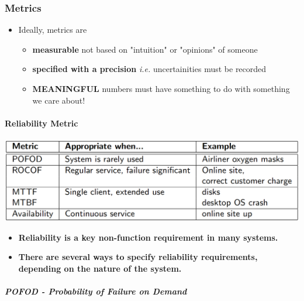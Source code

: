 \documentclass[a4paper]{article}
\providecommand{\tightlist}{%
  \setlength{\itemsep}{0pt}\setlength{\parskip}{0pt}}
\let\oldparagraph\paragraph
\renewcommand{\paragraph}[1]{\oldparagraph{#1}\mbox{}}
\let\oldsubparagraph\subparagraph
\renewcommand{\subparagraph}[1]{\oldsubparagraph{#1}\mbox{}}
\begin{document}
\hypertarget{metrics}{%
\subsubsection{Metrics}\label{metrics}}

\begin{itemize}
\tightlist
\item
  Ideally, metrics are

  \begin{itemize}
  \tightlist
  \item
    \textbf{measurable} not based on "intuition" or "opinions" of
    someone
  \item
    \textbf{specified with a precision} \emph{i.e.} uncertainities must
    be recorded
  \item
    \textbf{MEANINGFUL} numbers must have something to do with something
    we care about!
  \end{itemize}
\end{itemize}

\hypertarget{reliability-metric}{%
\paragraph{Reliability Metric}\label{reliability-metric}}

\includegraphics{2C-SE.assets/1543668447275.png}

\begin{itemize}
\tightlist
\item
  \textbf{Reliability is a key non-function requirement in many
  systems.}
\item
  \textbf{There are several ways to specify reliability requirements,
  depending on the nature of the system.}
\end{itemize}

\hypertarget{pofod---probability-of-failure-on-demand}{%
\subparagraph{POFOD - Probability of Failure on
Demand}\label{pofod---probability-of-failure-on-demand}}
\end{document}

